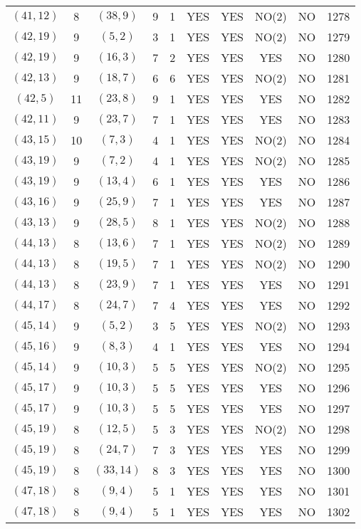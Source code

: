 \begin{longtable}{|c|c|c|c|c|c|c|c|c|c|}
$(41, 12)$ & 8 & $(38, 9)$ & 9 & 1 & YES & YES & NO(2) & NO & 1278\\
$(42, 19)$ & 9 & $(5, 2)$ & 3 & 1 & YES & YES & NO(2) & NO & 1279\\
$(42, 19)$ & 9 & $(16, 3)$ & 7 & 2 & YES & YES & YES & NO & 1280\\
$(42, 13)$ & 9 & $(18, 7)$ & 6 & 6 & YES & YES & NO(2) & NO & 1281\\
$(42, 5)$ & 11 & $(23, 8)$ & 9 & 1 & YES & YES & YES & NO & 1282\\
$(42, 11)$ & 9 & $(23, 7)$ & 7 & 1 & YES & YES & YES & NO & 1283\\
$(43, 15)$ & 10 & $(7, 3)$ & 4 & 1 & YES & YES & NO(2) & NO & 1284\\
$(43, 19)$ & 9 & $(7, 2)$ & 4 & 1 & YES & YES & NO(2) & NO & 1285\\
$(43, 19)$ & 9 & $(13, 4)$ & 6 & 1 & YES & YES & YES & NO & 1286\\
$(43, 16)$ & 9 & $(25, 9)$ & 7 & 1 & YES & YES & YES & NO & 1287\\
$(43, 13)$ & 9 & $(28, 5)$ & 8 & 1 & YES & YES & NO(2) & NO & 1288\\
$(44, 13)$ & 8 & $(13, 6)$ & 7 & 1 & YES & YES & NO(2) & NO & 1289\\
$(44, 13)$ & 8 & $(19, 5)$ & 7 & 1 & YES & YES & NO(2) & NO & 1290\\
$(44, 13)$ & 8 & $(23, 9)$ & 7 & 1 & YES & YES & YES & NO & 1291\\
$(44, 17)$ & 8 & $(24, 7)$ & 7 & 4 & YES & YES & YES & NO & 1292\\
$(45, 14)$ & 9 & $(5, 2)$ & 3 & 5 & YES & YES & NO(2) & NO & 1293\\
$(45, 16)$ & 9 & $(8, 3)$ & 4 & 1 & YES & YES & YES & NO & 1294\\
$(45, 14)$ & 9 & $(10, 3)$ & 5 & 5 & YES & YES & NO(2) & NO & 1295\\
$(45, 17)$ & 9 & $(10, 3)$ & 5 & 5 & YES & YES & YES & NO & 1296\\
$(45, 17)$ & 9 & $(10, 3)$ & 5 & 5 & YES & YES & YES & NO & 1297\\
$(45, 19)$ & 8 & $(12, 5)$ & 5 & 3 & YES & YES & NO(2) & NO & 1298\\
$(45, 19)$ & 8 & $(24, 7)$ & 7 & 3 & YES & YES & YES & NO & 1299\\
$(45, 19)$ & 8 & $(33, 14)$ & 8 & 3 & YES & YES & YES & NO & 1300\\
$(47, 18)$ & 8 & $(9, 4)$ & 5 & 1 & YES & YES & YES & NO & 1301\\
$(47, 18)$ & 8 & $(9, 4)$ & 5 & 1 & YES & YES & YES & NO & 1302\\

\end{longtable}
